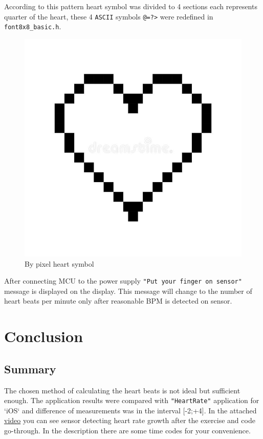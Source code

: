 \documentclass[a4paper, 11pt, twocolumn]{article}
\begin{document}
According to this pattern heart symbol was divided to 4 sections each represents quarter of the heart, these 4 \texttt{ASCII} symbols \texttt{@=?>} were redefined in \texttt{font8x8\_basic.h}.
\begin{figure}[h]
    \includegraphics[scale=0.4]{img/heart.jpg}
    \caption{By pixel heart symbol}
    \label{graph}
\end{figure}


After connecting MCU to the power supply \texttt{"Put your finger on sensor"} message is displayed
on the display. This message will change to the number of heart beats per minute only after reasonable BPM is detected on sensor.

\section{Conclusion}
\subsection{Summary}
The chosen method of calculating the heart beats is not ideal but sufficient enough. The application results were compared with \texttt{"HeartRate"} application for `iOS` and difference of measurements was in the interval [-2;+4]. In the attached \href{https://youtu.be/JHA2dlhXHdE}{video} you can see sensor detecting heart rate growth after the exercise and code go-through. In the description there are some time codes for your convenience.\\
\end{document}
